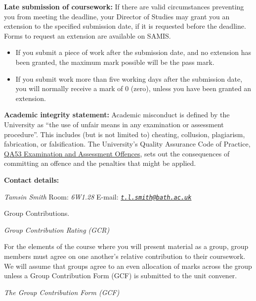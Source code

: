 \documentclass[
]{book}
\providecommand{\tightlist}{%
  \setlength{\itemsep}{0pt}\setlength{\parskip}{0pt}}
\begin{document}
\textbf{Late submission of coursework:} If there are valid circumstances preventing you from meeting the deadline, your Director of Studies may grant you an extension to the specified submission date, if it is requested before the deadline. Forms to request an extension are available on SAMIS.

\begin{itemize}
\tightlist
\item
  If you submit a piece of work after the submission date, and no extension has been granted, the maximum mark possible will be the pass mark.
\item
  If you submit work more than five working days after the submission date, you will normally receive a mark of 0 (zero), unless you have been granted an extension.
\end{itemize}

\textbf{Academic integrity statement:} Academic misconduct is defined by the University as ``the use of unfair means in any examination or assessment procedure''. This includes (but is not limited to) cheating, collusion, plagiarism, fabrication, or falsification. The University's Quality Assurance Code of Practice, \href{https://www.bath.ac.uk/publications/qa53-examination-and-assessment-offences/}{QA53 Examination and Assessment Offences}, sets out the consequences of committing an offence and the penalties that might be applied.

\textbf{Contact details:}

\emph{Tamsin Smith}\newline
Room: \emph{6W1.28} \newline
E-mail: \emph{\href{mailto:t.l.smith@bath.ac.uk}{\nolinkurl{t.l.smith@bath.ac.uk}}}

Group Contributions.

\emph{Group Contribution Rating (GCR)}

For the elements of the course where you will present material as a group, group members must agree on one another's relative contribution to their coursework. We will assume that groups agree to an even allocation of marks across the group unless a Group Contribution Form (GCF) is submitted to the unit convener.

\emph{The Group Contribution Form (GCF)}
\end{document}
